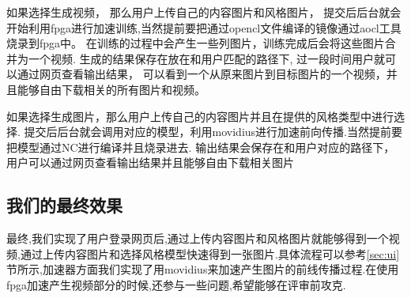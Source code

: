 如果选择生成视频， 那么用户上传自己的内容图片和风格图片，
提交后后台就会开始利用fpga进行加速训练,当然提前要把通过opencl文件编译的镜像通过aocl工具烧录到fpga中。
在训练的过程中会产生一些列图片，训练完成后会将这些图片合并为一个视频.
生成的结果保存在放在和用户匹配的路径下, 过一段时间用户就可以通过网页查看输出结果，
可以看到一个从原来图片到目标图片的一个视频，并且能够自由下载相关的所有图片和视频。

如果选择生成图片，那么用户上传自己的内容图片并且在提供的风格类型中进行选择.
提交后后台就会调用对应的模型，利用movidius进行加速前向传播.当然提前要把模型通过NC进行编译并且烧录进去.
输出结果会保存在和用户对应的路径下，用户可以通过网页查看输出结果并且能够自由下载相关图片

\subsection{我们的最终效果}
最终,我们实现了用户登录网页后,通过上传内容图片和风格图片就能够得到一个视频,通过上传内容图片和选择风格模型快速得到一张图片.具体流程可以参考\ref{sec:ui}节所示,加速器方面我们实现了用movidius来加速产生图片的前线传播过程.在使用fpga加速产生视频部分的时候,还参与一些问题,希望能够在评审前攻克.
